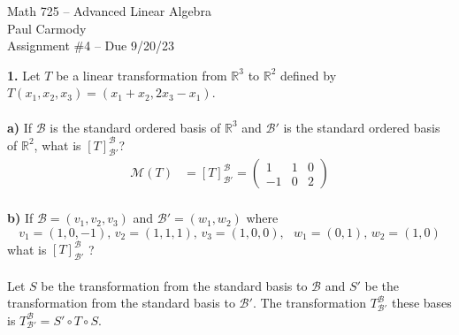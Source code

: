 \documentclass[11pt]{amsart}
\theoremstyle{definition}  %
\newcommand{\R}{\mathbb{R}}
\begin{document}
\newcommand{\MM}{\mathcal{M}}
\newcommand{\BB}{\mathcal{B}}
\newcommand{\LL}{\mathcal{L}}

\begin{center}
\Large{Math 725 -- Advanced Linear Algebra}\\
\large{Paul Carmody}\\
Assignment \#4 -- Due 9/20/23
\end{center}


\vskip 1.1cm
\noindent
{\bf 1.} Let $T$ be a linear transformation from $\R^3$ to $\R^2$ defined by $T(x_1,x_2,x_3) =(x_1+x_2, 2x_3-x_1)$. \\ \\
{\bf a)} If $\mathcal{B}$ is the standard ordered basis of $\R^3$ and $\mathcal{B}'$ is the standard ordered basis of $\R^2$, what is 
$[T]_{\mathcal{B}'}^{\mathcal{B}}$?\\
\begin{align*}
	\mathcal{M}(T) &= [T]_{\mathcal{B}'}^\mathcal{B}=\left ( \begin{array}{ccc}
		1 & 1 & 0 \\
		-1 & 0 & 2
	\end{array}\right )
\end{align*}
\\
{\bf b)} If $\mathcal{B} = (v_1, v_2, v_3)$ and $\mathcal{B}' = (w_1, w_2)$ where
$$ v_1 = (1,0,-1), \, v_2 = ( 1,1,1), \, v_3 = (1,0,0), \,\,\,\, w_1 = (0,1), \, w_2 = (1,0)$$
what is $[T]_{\mathcal{B}'}^{\mathcal{B}}$ ?\\
\\
Let $S$ be the transformation from the standard basis to $\BB$ and $S'$ be the transformation from the standard basis to $\BB'$.  The transformation $T_{\BB'}^\BB$ these bases is $T_{\BB'}^\BB = S'\circ T \circ S$.
\end{document}
